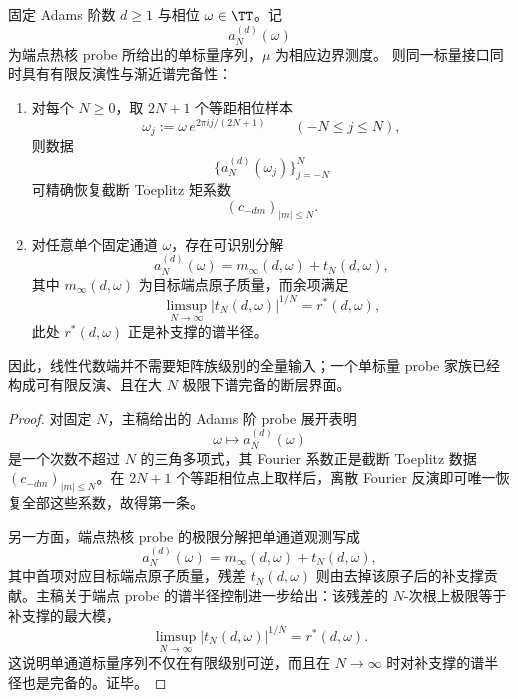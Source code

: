 \begin{theorem}\label{thm:conclusion-single-scalar-toeplitz-tomography}
固定 Adams 阶数 \(d\ge 1\) 与相位 \(\omega\in\TT\)。记
\[
a_N^{(d)}(\omega)
\]
为端点热核 probe 所给出的单标量序列，\(\mu\) 为相应边界测度。
则同一标量接口同时具有有限反演性与渐近谱完备性：
\begin{enumerate}
  \item 对每个 \(N\ge 0\)，取 \(2N+1\) 个等距相位样本
  \[
  \omega_j:=\omega\,e^{2\pi ij/(2N+1)}
  \qquad (-N\le j\le N),
  \]
  则数据
  \[
  \{a_N^{(d)}(\omega_j)\}_{j=-N}^{N}
  \]
  可精确恢复截断 Toeplitz 矩系数
  \[
  (c_{-dm})_{|m|\le N}.
  \]
  \item 对任意单个固定通道 \(\omega\)，存在可识别分解
  \[
  a_N^{(d)}(\omega)=m_\infty(d,\omega)+t_N(d,\omega),
  \]
  其中 \(m_\infty(d,\omega)\) 为目标端点原子质量，而余项满足
  \[
  \limsup_{N\to\infty}|t_N(d,\omega)|^{1/N}=r^\ast(d,\omega),
  \]
  此处 \(r^\ast(d,\omega)\) 正是补支撑的谱半径。
\end{enumerate}
因此，线性代数端并不需要矩阵族级别的全量输入；一个单标量 probe 家族已经构成可有限反演、且在大 \(N\) 极限下谱完备的断层界面。
\end{theorem}
\begin{proof}
对固定 \(N\)，主稿给出的 Adams 阶 probe 展开表明
\[
\omega\longmapsto a_N^{(d)}(\omega)
\]
是一个次数不超过 \(N\) 的三角多项式，其 Fourier 系数正是截断 Toeplitz 数据 \((c_{-dm})_{|m|\le N}\)。在 \(2N+1\) 个等距相位点上取样后，离散 Fourier 反演即可唯一恢复全部这些系数，故得第一条。

另一方面，端点热核 probe 的极限分解把单通道观测写成
\[
a_N^{(d)}(\omega)=m_\infty(d,\omega)+t_N(d,\omega),
\]
其中首项对应目标端点原子质量，残差 \(t_N(d,\omega)\) 则由去掉该原子后的补支撑贡献。主稿关于端点 probe 的谱半径控制进一步给出：该残差的 \(N\)-次根上极限等于补支撑的最大模，
\[
\limsup_{N\to\infty}|t_N(d,\omega)|^{1/N}=r^\ast(d,\omega).
\]
这说明单通道标量序列不仅在有限级别可逆，而且在 \(N\to\infty\) 时对补支撑的谱半径也是完备的。证毕。
\end{proof}

